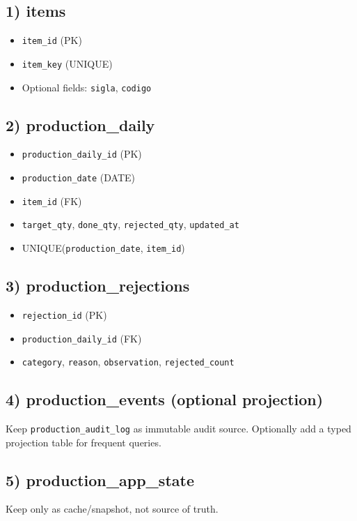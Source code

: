 \documentclass[11pt,a4paper]{article}
\begin{document}
\subsection*{1) items}
\begin{itemize}
  \item \texttt{item\_id} (PK)
  \item \texttt{item\_key} (UNIQUE)
  \item Optional fields: \texttt{sigla}, \texttt{codigo}
\end{itemize}

\subsection*{2) production\_daily}
\begin{itemize}
  \item \texttt{production\_daily\_id} (PK)
  \item \texttt{production\_date} (DATE)
  \item \texttt{item\_id} (FK)
  \item \texttt{target\_qty}, \texttt{done\_qty}, \texttt{rejected\_qty}, \texttt{updated\_at}
  \item UNIQUE(\texttt{production\_date}, \texttt{item\_id})
\end{itemize}

\subsection*{3) production\_rejections}
\begin{itemize}
  \item \texttt{rejection\_id} (PK)
  \item \texttt{production\_daily\_id} (FK)
  \item \texttt{category}, \texttt{reason}, \texttt{observation}, \texttt{rejected\_count}
\end{itemize}

\subsection*{4) production\_events (optional projection)}
Keep \texttt{production\_audit\_log} as immutable audit source. Optionally add a typed projection table for frequent queries.

\subsection*{5) production\_app\_state}
Keep only as cache/snapshot, not source of truth.
\end{document}
